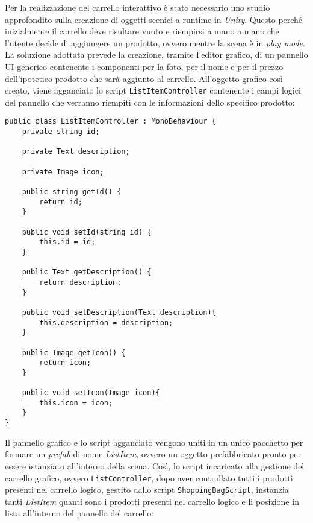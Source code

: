 Per la realizzazione del carrello interattivo è stato necessario uno studio approfondito sulla creazione di oggetti scenici a runtime in \textit{Unity}. Questo perché inizialmente il carrello deve risultare vuoto e riempirsi a mano a mano che l'utente decide di aggiungere un prodotto, ovvero mentre la scena è in \textit{play mode}. \\ 
La soluzione adottata prevede la creazione, tramite l'editor grafico, di un pannello UI generico contenente i componenti per la foto, per il nome e per il prezzo dell'ipotetico prodotto che sarà aggiunto al carrello. All'oggetto grafico così creato, viene agganciato lo script \texttt{ListItemController} contenente i campi logici del pannello che verranno riempiti con le informazioni dello specifico prodotto: 

\begin{lstlisting}[style=MyCStyle]
public class ListItemController : MonoBehaviour {
	private string id;

	private Text description;

	private Image icon;

	public string getId() {
		return id;
	}

	public void setId(string id) {
		this.id = id;
	}
	
	public Text getDescription() {
		return description;
	}
	
	public void setDescription(Text description){
		this.description = description;
	}
	
	public Image getIcon() {
		return icon;
	}
		
	public void setIcon(Image icon){
		this.icon = icon;
	}
}
\end{lstlisting}

Il pannello grafico e lo script agganciato vengono uniti in un unico pacchetto per formare un \textit{prefab} di nome \textit{ListItem}, ovvero un oggetto prefabbricato pronto per essere istanziato all'interno della scena. Così, lo script incaricato alla gestione del carrello grafico, ovvero \texttt{ListController}, dopo aver controllato tutti i prodotti presenti nel carrello logico, gestito dallo script \texttt{ShoppingBagScript}, instanzia tanti \textit{ListItem} quanti sono i prodotti presenti nel carrello logico e li posizione in lista all'interno del pannello del carrello:

